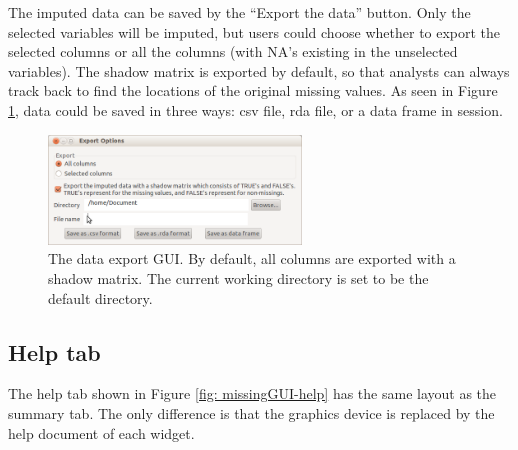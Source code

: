\documentclass[article]{jss}
\begin{document}
The imputed data can be saved by the ``Export the data'' button. Only the selected variables will be imputed, but users could choose whether to export the selected columns or all the columns (with NA's existing in the unselected variables). The shadow matrix is exported by default, so that analysts can always track back to find the locations of the original missing values. As seen in Figure \ref{fig: export}, data could be saved in three ways: csv file, rda file, or a data frame in  session.

\begin{center}
\begin{figure}[h]
\begin{centering}
\includegraphics[width=0.6\textwidth]{fig7}
\par\end{centering}
\caption{The data export GUI. By default, all columns are exported with a shadow matrix. The current working directory is set to be the default directory.}
\label{fig: export}
\end{figure}
\par\end{center}


\subsection{Help tab}

The help tab shown in Figure \ref{fig: missingGUI-help} has the same layout as the summary tab. The only difference is that the graphics device is replaced by the help document of each widget.
\end{document}
